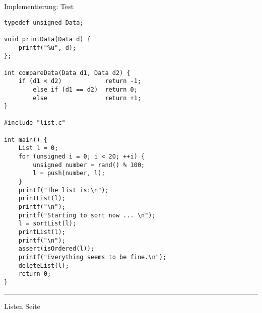 \begin{slide}{}
\normalsize

\begin{center}
Implementierung: Test
\end{center}
\vspace*{0.5cm}

\footnotesize
\begin{verbatim}
typedef unsigned Data;

void printData(Data d) {
    printf("%u", d);
};

int compareData(Data d1, Data d2) {
    if (d1 < d2)            return -1;
        else if (d1 == d2)  return 0;
        else                return +1;    
}   

#include "list.c"

int main() {
    List l = 0;
    for (unsigned i = 0; i < 20; ++i) {
        unsigned number = rand() % 100;
        l = push(number, l);
    }
    printf("The list is:\n");
    printList(l);
    printf("\n");
    printf("Starting to sort now ... \n");
    l = sortList(l);
    printList(l);
    printf("\n");
    assert(isOrdered(l));
    printf("Everything seems to be fine.\n");
    deleteList(l);
    return 0;
}
\end{verbatim}

\vspace*{\fill}
\tiny \addtocounter{mypage}{1}
\rule{17cm}{1mm}
Listen  \hspace*{\fill} Seite 
\end{slide}


